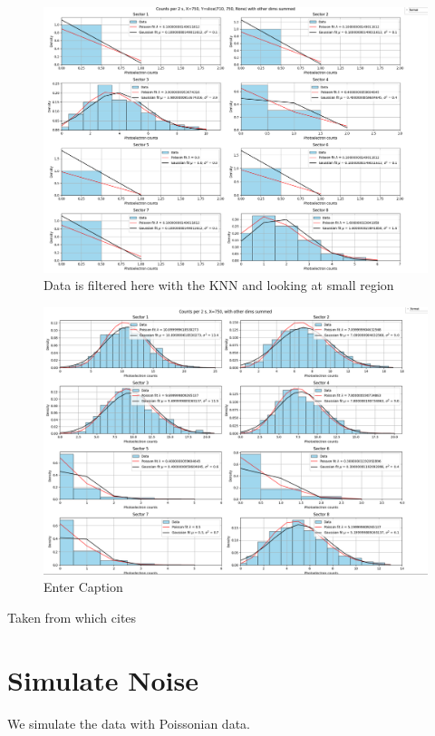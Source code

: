 \begin{figure}
    \centering
    \includegraphics[width=1\linewidth]{images/poisson_stats/after_filtering_region_1000s.png}
    \caption{Data is filtered here with the KNN and looking at small region}
\end{figure}

\begin{figure}
    \centering
    \includegraphics[width=1\linewidth]{images/poisson_stats/filtered_allY_singleX.png}
    \caption{Enter Caption}
\end{figure}


Taken from \cite{berteroImageDeblurringPoisson2009} which cites \cite{fellerIntroductionProbabilityTheory1968}
\section{Simulate Noise}
We simulate the data with Poissonian data.
